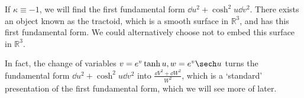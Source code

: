 \begin{remark}
	If $\kappa \equiv -1$, we will find the first fundamental form $\dd{u}^2 + \cosh^2 u \dd{v}^2$.
	There exists an object known as the tractoid, which is a smooth surface in $\mathbb R^3$, and has this first fundamental form.
	We could alternatively choose not to embed this surface in $\mathbb R^3$.

	In fact, the change of variables $v = e^v \tanh u, w = e^v \sech u$ turns the fundamental form $\dd{u}^2 + \cosh^2 u \dd{v}^2$ into $\frac{\dd{V}^2 + \dd{W}^2}{W^2}$, which is a `standard' presentation of the first fundamental form, which we will see more of later.
\end{remark}
